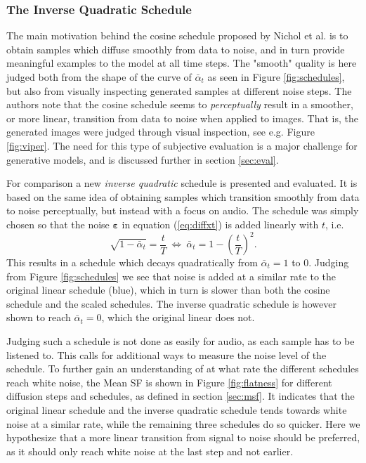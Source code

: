 \documentclass{report}
\begin{document}
\subsubsection{The Inverse Quadratic Schedule} \label{sec:invquad}
The main motivation behind the cosine schedule proposed by Nichol et al. \cite{nichol2021improved} is to obtain samples which diffuse smoothly from data to noise, and in turn provide meaningful examples to the model at all time steps. The "smooth" quality is here judged both from the shape of the curve of $\bar{\alpha}_t$ as seen in Figure \ref{fig:schedules}, but also from visually inspecting generated samples at different noise steps. The authors note that the cosine schedule seems to \textit{perceptually} result in a smoother, or more linear, transition from data to noise when applied to images. That is, the generated images were judged through visual inspection, see e.g. Figure \ref{fig:viper}. The need for this type of subjective evaluation is a major challenge for generative models, and is discussed further in section \ref{sec:eval}.

For comparison a new \textit{inverse quadratic} schedule is presented and evaluated. It is based on the same idea of obtaining samples which transition smoothly from data to noise perceptually, but instead with a focus on audio. The schedule was simply chosen so that the noise $\bm{\varepsilon}$ in equation (\ref{eq:diffxt}) is added linearly with $t$, i.e.
\begin{equation}
    \sqrt{1-\bar{\alpha}_t} = \frac{t}{T} \ \Leftrightarrow \ \bar{\alpha}_t = 1-\left(\frac{t}{T}\right)^2.
\end{equation}
This results in a schedule which decays quadratically from $\bar{\alpha}_t = 1$ to $0$. Judging from Figure \ref{fig:schedules} we see that noise is added at a similar rate to the original linear schedule (blue), which in turn is slower than both the cosine schedule and the scaled schedules. The inverse quadratic schedule is however shown to reach $\bar{\alpha}_t = 0$, which the original linear does not. 

Judging such a schedule is not done as easily for audio, as each sample has to be listened to. This calls for additional ways to measure the noise level of the schedule. To further gain an understanding of at what rate the different schedules reach white noise, the Mean SF is shown in Figure \ref{fig:flatness} for different diffusion steps and schedules, as defined in section \ref{sec:msf}. It indicates that the original linear schedule and the inverse quadratic schedule tends towards white noise at a similar rate, while the remaining three schedules do so quicker. Here we hypothesize that a more linear transition from signal to noise should be preferred, as it should only reach white noise at the last step and not earlier.
\end{document}
